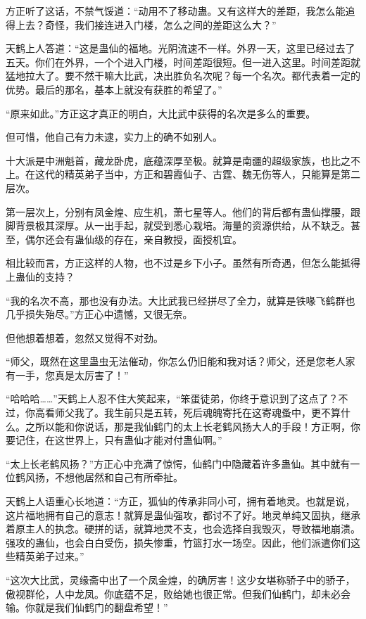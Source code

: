 \begin{this_body}
方正听了这话，不禁气馁道：“动用不了移动蛊。又有这样大的差距，我怎么能追得上去？奇怪，我们接连进入门楼，怎么之间的差距这么大？”

天鹤上人答道：“这是蛊仙的福地。光阴流速不一样。外界一天，这里已经过去了五天。你们在外界，一个个进入门楼，时间差距很短。但一进入这里。时间差距就猛地拉大了。要不然干嘛大比武，决出胜负名次呢？每一个名次。都代表着一定的优势。最后的那名，基本上就没有获胜的希望了。”

“原来如此。”方正这才真正的明白，大比武中获得的名次是多么的重要。

但可惜，他自己有力未逮，实力上的确不如别人。

十大派是中洲魁首，藏龙卧虎，底蕴深厚至极。就算是南疆的超级家族，也比之不上。在这代的精英弟子当中，方正和碧霞仙子、古霆、魏无伤等人，只能算是第二层次。

第一层次上，分别有凤金煌、应生机，萧七星等人。他们的背后都有蛊仙撑腰，跟脚背景极其深厚。从一出手起，就受到悉心栽培。海量的资源供给，从不缺乏。甚至，偶尔还会有蛊仙级的存在，亲自教授，面授机宜。

相比较而言，方正这样的人物，也不过是乡下小子。虽然有所奇遇，但怎么能抵得上蛊仙的支持？

“我的名次不高，那也没有办法。大比武我已经拼尽了全力，就算是铁喙飞鹤群也几乎损失殆尽。”方正心中遗憾，又很无奈。

但他想着想着，忽然又觉得不对劲。

“师父，既然在这里蛊虫无法催动，你怎么仍旧能和我对话？师父，还是您老人家有一手，您真是太厉害了！”

“哈哈哈……”天鹤上人忍不住大笑起来，“笨蛋徒弟，你终于意识到了这点了？不过，你高看师父我了。我生前只是五转，死后魂魄寄托在这寄魂蚤中，更不算什么。之所以能和你说话，那是我仙鹤门的太上长老鹤风扬大人的手段！方正啊，你要记住，在这世界上，只有蛊仙才能对付蛊仙啊。”

“太上长老鹤风扬？”方正心中充满了惊愕，仙鹤门中隐藏着许多蛊仙。其中就有一位鹤风扬，不想他居然和自己有所牵扯。

天鹤上人语重心长地道：“方正，狐仙的传承非同小可，拥有着地灵。也就是说，这片福地拥有自己的意志！就算是蛊仙强攻，都讨不了好。地灵单纯又固执，继承着原主人的执念。硬拼的话，就算地灵不支，也会选择自我毁灭，导致福地崩溃。强攻的蛊仙，也会白白受伤，损失惨重，竹篮打水一场空。因此，他们派遣你们这些精英弟子过来。”

“这次大比武，灵缘斋中出了一个凤金煌，的确厉害！这少女堪称骄子中的骄子，傲视群伦，人中龙凤。你底蕴不足，败给她也很正常。但我们仙鹤门，却未必会输。你就是我们仙鹤门的翻盘希望！”


\end{this_body}
